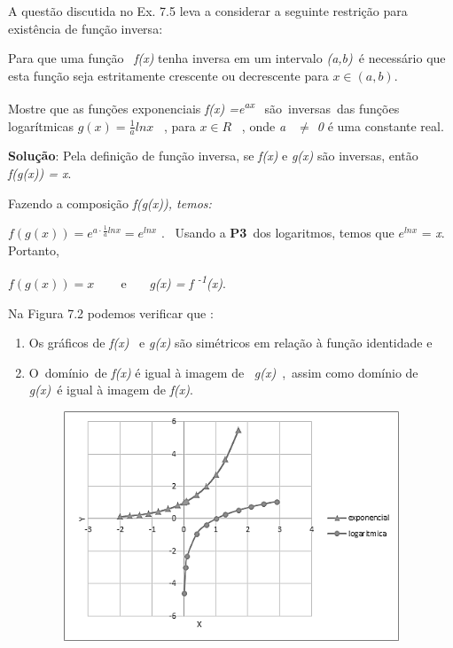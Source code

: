A questão discutida no Ex. 7.5 leva a considerar a seguinte restrição para existência de função inversa:

\begin{caixa}

Para que uma função~ \textit{f(x) } tenha inversa em um intervalo \textit{(a,b)}~é necessário que esta  função seja estritamente crescente ou decrescente para  \( x  \in  \left( a,b \right) .  \) 

\end{caixa}

\begin{texemplo}
    Mostre que as funções exponenciais   \textit{f(x) =e\textsuperscript{ax}}~ são~inversas~das funções logarítmicas    \( g \left( x \right) =\frac{1}{a}lnx \) ~,  para \textit{  \( x  \in  R  \) }~, onde  \textit{a~ $ \neq $  0 } é uma constante real.

    \textbf{Solução}: Pela definição de função inversa, se \textit{f(x)} e \textit{g(x)} são inversas, então \textit{f(g(x)) = x}. 

    Fazendo a composição \textit{f(g(x)), temos:}

    \( f \left( g \left( x \right)  \right) =e^{a \cdot \frac{1}{a}lnx}=e^{lnx} \) .~ Usando a \textbf{P3}~dos logaritmos, temos que   \( e^{lnx} \)  = \textit{x}. Portanto,

    \( f \left( g \left( x \right)  \right) =x \) ~~~ e~~~ \textit{g(x) = f \textsuperscript{-1}(x)}. 

    Na Figura 7.2 podemos verificar que :

    \begin{enumerate}
	    \item Os gráficos de \textit{f(x)}~ e \textit{g(x)} são simétricos em relação à função identidade e

	    \item  O~domínio~de   \textit{f(x)} é igual à imagem de~ \textit{g(x)}~,~assim como domínio de   \textit{g(x)}~é igual à imagem de  \textit{f(x)}. \qedsymbol{}
    \end{enumerate}

    \begin{figure}[H]
	    \begin{Center}
		    \includegraphics[width=4.77in,height=2.7in]{capitulos/logaritmos_e_funcao_logaritmica/media/image4.png}
	    \end{Center}
    \end{figure}
\end{texemplo}

